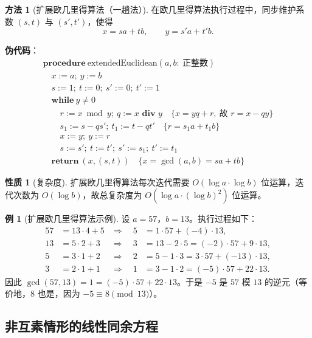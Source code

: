 \documentclass[UTF8,11pt,a4paper]{ctexbook}   %
\theoremstyle{definition}
\newtheorem{example}{例}[section]
\newtheorem{property}{性质}[section]
\newtheorem{method}{方法}[section]
\begin{document}
\begin{method}[扩展欧几里得算法（一趟法）]
在欧几里得算法执行过程中，同步维护系数 $(s,t)$ 与 $(s',t')$，使得
\[
x = sa + tb,\qquad y = s'a + t'b.
\]

\textbf{伪代码}：
\[
\begin{array}{l}
\textbf{procedure}\ \text{extendedEuclidean}(a,b:\ \text{正整数})\\
\quad x := a;\ y := b\\
\quad s := 1;\ t := 0;\ s' := 0;\ t' := 1\\
\quad \textbf{while}\ y \neq 0\\
\quad \quad r := x \bmod y;\ q := x \textbf{ div } y \quad \{x = yq + r,\ \text{故 } r = x - qy\}\\
\quad \quad s_1 := s - q s';\ t_1 := t - q t' \quad \{r = s_1 a + t_1 b\}\\
\quad \quad x := y;\ y := r\\
\quad \quad s := s';\ t := t';\ s' := s_1;\ t' := t_1\\
\quad \textbf{return}\ (x, (s,t)) \quad \{x = \gcd(a,b) = sa + tb\}
\end{array}
\]
\end{method}

\begin{property}[复杂度]
扩展欧几里得算法每次迭代需要 $O(\log a \cdot \log b)$ 位运算，迭代次数为 $O(\log b)$，故总复杂度为 $O(\log a \cdot (\log b)^2)$ 位运算。
\end{property}

\begin{example}[扩展欧几里得算法示例]
设 $a=57$，$b=13$。执行过程如下：
\begin{align*}
57 &= 13\cdot 4 + 5 & \Rightarrow\quad 5 &= 1\cdot 57 + (-4)\cdot 13,\\
13 &= 5\cdot 2 + 3 & \Rightarrow\quad 3 &= 13 - 2\cdot 5 = (-2)\cdot 57 + 9\cdot 13,\\
5 &= 3\cdot 1 + 2 & \Rightarrow\quad 2 &= 5 - 1\cdot 3 = 3\cdot 57 + (-13)\cdot 13,\\
3 &= 2\cdot 1 + 1 & \Rightarrow\quad 1 &= 3 - 1\cdot 2 = (-5)\cdot 57 + 22\cdot 13.
\end{align*}
因此 $\gcd(57,13)=1 = (-5)\cdot 57 + 22\cdot 13$。于是 $-5$ 是 $57$ 模 $13$ 的逆元（等价地，$8$ 也是，因为 $-5 \equiv 8 \pmod{13}$）。
\end{example}

\subsection{非互素情形的线性同余方程}
\end{document}
